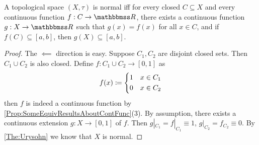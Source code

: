 \documentclass[screen,single]{techreport}
\numberwithin{equation}{section}
\begin{document}
\begin{theorem}\label{The:TietzeExtension}
	A topological space $(X,\tau)$ is normal iff for every closed $C \subseteq X$ and every continuous function $f: C \to \bbR$, there exists a continuous function $g: X \to \bbR$ such that $g(x) = f(x)$ for all $x \in C$, and if $f(C) \subseteq [a,b]$, then $g(X) \subseteq [a,b]$.
\end{theorem}
\begin{proof}
	The $\impliedby$ direction is easy.
	Suppose $C_1,C_2$ are disjoint closed sets.
	Then $C_1 \cup C_2$ is also closed.
	Define $f : C_1 \cup C_2 \to [0,1]$ as
	\[
	f(x) \coloneqq \begin{dcases}
 		1 & x \in C_1 \\
 		0 & x \in C_2	
 	\end{dcases}
	\]
	then $f$ is indeed a continuous function by \cref{Prop:SomeEquivResultsAboutContFunc}(3).
	By assumption, there exists a continuous extension $g : X \to [0,1]$ of $f$.
	Then $g|_{C_1} = f|_{C_1} \equiv 1$, $g|_{C_2} = f_{C_2} \equiv 0$.
	By \cref{The:Urysohn} we know that $X$ is normal.
	

\end{proof}
\end{document}

